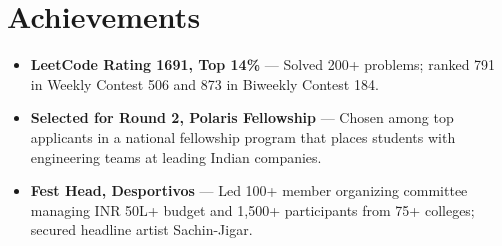\documentclass[letterpaper,11pt]{article}
\newcommand{\resumeSubHeadingListStart}{\begin{itemize}[leftmargin=0.15in, label={}]}
\newcommand{\resumeSubHeadingListEnd}{\end{itemize}}
\begin{document}
\section{Achievements}
  \resumeSubHeadingListStart
     \item\small{\textbf{LeetCode Rating 1691, Top 14\%} --- Solved 200+ problems; ranked 791 in Weekly Contest 506 and 873 in Biweekly Contest 184.}
    \vspace{-2pt}
    \item\small{\textbf{Selected for Round 2, Polaris Fellowship} --- Chosen among top applicants in a national fellowship program that places students with engineering teams at leading Indian companies.}
    \vspace{-2pt}
    \item\small{\textbf{Fest Head, Desportivos} --- Led 100+ member organizing committee managing INR 50L+ budget and 1,500+ participants from 75+ colleges; secured headline artist Sachin-Jigar.}
  \resumeSubHeadingListEnd

\end{document}
